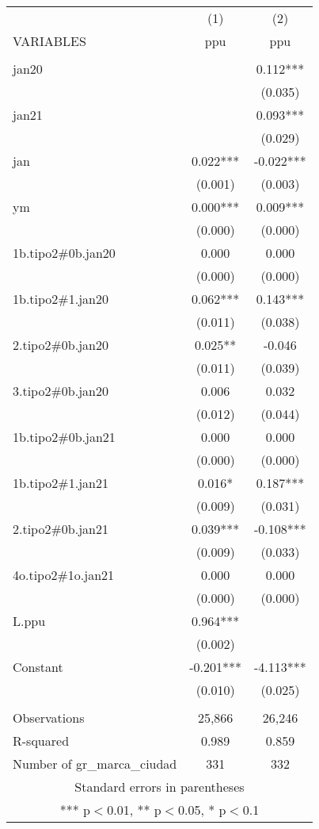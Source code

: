 \begin{tabular}{lcc} \hline
 & (1) & (2) \\
VARIABLES & ppu & ppu \\ \hline
 &  &  \\
jan20 &  & 0.112*** \\
 &  & (0.035) \\
jan21 &  & 0.093*** \\
 &  & (0.029) \\
jan & 0.022*** & -0.022*** \\
 & (0.001) & (0.003) \\
ym & 0.000*** & 0.009*** \\
 & (0.000) & (0.000) \\
1b.tipo2\#0b.jan20 & 0.000 & 0.000 \\
 & (0.000) & (0.000) \\
1b.tipo2\#1.jan20 & 0.062*** & 0.143*** \\
 & (0.011) & (0.038) \\
2.tipo2\#0b.jan20 & 0.025** & -0.046 \\
 & (0.011) & (0.039) \\
3.tipo2\#0b.jan20 & 0.006 & 0.032 \\
 & (0.012) & (0.044) \\
1b.tipo2\#0b.jan21 & 0.000 & 0.000 \\
 & (0.000) & (0.000) \\
1b.tipo2\#1.jan21 & 0.016* & 0.187*** \\
 & (0.009) & (0.031) \\
2.tipo2\#0b.jan21 & 0.039*** & -0.108*** \\
 & (0.009) & (0.033) \\
4o.tipo2\#1o.jan21 & 0.000 & 0.000 \\
 & (0.000) & (0.000) \\
L.ppu & 0.964*** &  \\
 & (0.002) &  \\
Constant & -0.201*** & -4.113*** \\
 & (0.010) & (0.025) \\
 &  &  \\
Observations & 25,866 & 26,246 \\
R-squared & 0.989 & 0.859 \\
 Number of gr\_marca\_ciudad & 331 & 332 \\ \hline
\multicolumn{3}{c}{ Standard errors in parentheses} \\
\multicolumn{3}{c}{ *** p$<$0.01, ** p$<$0.05, * p$<$0.1} \\
\end{tabular}

